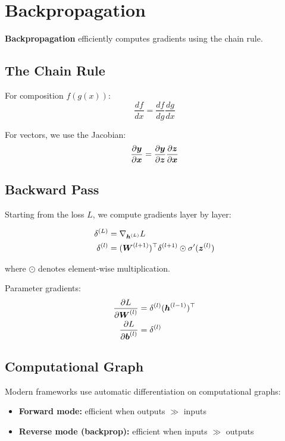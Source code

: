 
\section{Backpropagation}
\label{sec:backpropagation}

\textbf{Backpropagation} efficiently computes gradients using the chain rule.

\subsection{The Chain Rule}

For composition $f(g(x))$:
\begin{equation}
\frac{df}{dx} = \frac{df}{dg} \frac{dg}{dx}
\end{equation}

For vectors, we use the Jacobian:
\begin{equation}
\frac{\partial \boldsymbol{y}}{\partial \boldsymbol{x}} = \frac{\partial \boldsymbol{y}}{\partial \boldsymbol{z}} \frac{\partial \boldsymbol{z}}{\partial \boldsymbol{x}}
\end{equation}

\subsection{Backward Pass}

Starting from the loss $L$, we compute gradients layer by layer:

\begin{align}
\delta^{(L)} &= \nabla_{\boldsymbol{h}^{(L)}} L \\
\delta^{(l)} &= (\boldsymbol{W}^{(l+1)})^\top \delta^{(l+1)} \odot \sigma'(\boldsymbol{z}^{(l)})
\end{align}

where $\odot$ denotes element-wise multiplication.

Parameter gradients:
\begin{align}
\frac{\partial L}{\partial \boldsymbol{W}^{(l)}} &= \delta^{(l)} (\boldsymbol{h}^{(l-1)})^\top \\
\frac{\partial L}{\partial \boldsymbol{b}^{(l)}} &= \delta^{(l)}
\end{align}

\subsection{Computational Graph}

Modern frameworks use automatic differentiation on computational graphs:
\begin{itemize}
    \item \textbf{Forward mode:} efficient when outputs $\gg$ inputs
    \item \textbf{Reverse mode (backprop):} efficient when inputs $\gg$ outputs
\end{itemize}

